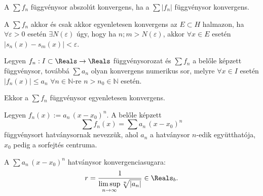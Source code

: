 \documentclass[a4paper, 12pt]{scrartcl}
\begin{document}
\begin{definition}
  A $\sum f_n$ függvénysor abszolút konvergens, ha a $\sum \left| f_n \right|$
  függvénysor konvergens.
\end{definition}

\begin{theorem}
  A $\sum f_n$ akkor és csak akkor egyenletesen konvergens az
  $E \subset H$ halmazon, ha $\forall \varepsilon > 0$ esetén
  $\exists N(\varepsilon)$ úgy, hogy ha $n; m > N(\varepsilon)$,
  akkor $\forall x \in E$ esetén ${|s_n(x) - s_m(x)| < \varepsilon}$.
\end{theorem}

\begin{theorem}
  Legyen $f_n : I \subset \Reals \to \Reals$ függvénysorozat és $\sum f_n$
  a belőle képzett függvénysor, továbbá $\sum a_n$ olyan konvergens numerikus
  sor, melyre $\forall x \in I$ esetén $|f_n(x)| \leq a_n$
  $\forall n \in \mathbb N$-re $n > n_0 \in \mathbb N$ esetén.

  Ekkor a $\sum f_n$ függvénysor egyenletesen konvergens.
\end{theorem}

\clearpage

\begin{definition}[Hatványsor]
  Legyen $f_n(x) := a_n \, (x - x_0)^n$. A belőle képzett
  $$
    \sum f_n(x) = \sum a_n \, (x - x_0)^n
  $$
  függvénysort hatványsornak nevezzük, ahol $a_n$ a hatványsor $n$-edik
  együtthatója, $x_0$ pedig a sorfejtés centruma.
\end{definition}

\begin{definition}
  A $\sum a_n \, (x - x_0)^n$ hatványsor konvergenciasugara:
  $$
    r = \frac{1}{\limsup\limits_{n \to \infty} \sqrt[n]{|a_n|}} \in \Reals_b
    \text.
  $$
\end{definition}
\end{document}
